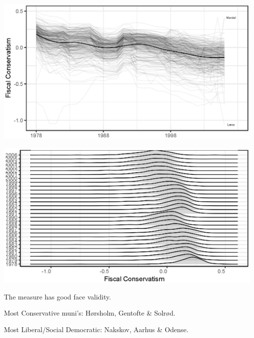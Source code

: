 \documentclass[10pt,aspectratio=169]{beamer}
\begin{document}
\begin{frame}

\end{frame}

\begin{frame}
	\includegraphics[width=1\textwidth]{images/newtimes_lines.eps}
\end{frame}

\begin{frame}
	\includegraphics[width=1\textwidth]{images/newJoyPlotFiscal.eps}
\end{frame}

\begin{frame}			

The measure has good face validity.

\vspace{0.2in}

Most Conservative muni's: Hørsholm, Gentofte \& Solrød.

\vspace{0.2in}

Most Liberal/Social Democratic: Nakskov, Aarhus \& Odense.

\end{frame}
\end{document}
